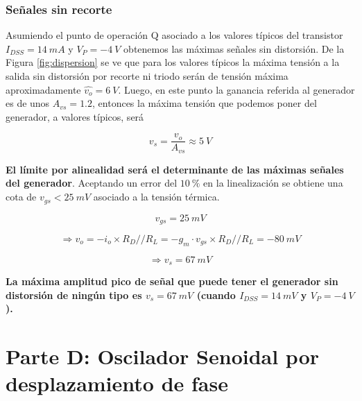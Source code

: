 \begin{multicols}{2}
        \subsubsection{Señales sin recorte}

        Asumiendo el punto de operación Q asociado a los valores típicos del transistor $I_{DSS} = 14\ mA$ y $V_P = -4\ V$ obtenemos las máximas señales sin distorsión. De la Figura \ref{fig:dispersion} se ve que para los valores típicos la máxima tensión a la salida sin distorsión por recorte ni triodo serán de tensión máxima aproximadamente $\hat{v_o} = 6\ V$. Luego, en este punto la ganancia referida al generador es de unos $A_{vs} = 1.2$, entonces la máxima tensión que podemos poner del generador, a valores típicos, será

        \begin{equation}
        	v_s = \frac{v_o}{A_{vs}} \approx 5\ V \nonumber
        	\end{equation}

        \textbf{El límite por alinealidad será el determinante de las máximas señales del generador}. Aceptando un error del $10\ \%$ en la linealización se obtiene una cota de $v_{gs} < 25\ mV$ asociado a la tensión térmica.

        \begin{equation}
        	v_{gs} = 25\ mV
        \end{equation}

        \begin{equation}
        	\Rightarrow v_o = -i_o\times R_D//R_L = -g_m\cdot v_{gs} \times R_D//R_L = - 80\ mV
        \end{equation}

        \begin{equation}
        	\Rightarrow v_s = 67\ mV
        \end{equation}

        \textbf{La máxima amplitud pico de señal que puede tener el generador sin distorsión de ningún tipo es $v_s = 67\ mV$ (cuando $I_{DSS} = 14\ mV$ y $V_P = -4\ V$).}

        \newpage

        \section{Parte D: Oscilador Senoidal por desplazamiento de fase}


\end{multicols}
